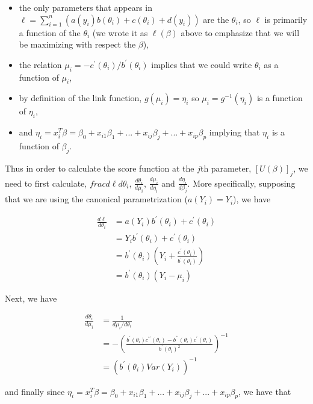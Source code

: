 \begin{itemize}
\item the only parameters that appears in $\ell = \sum_{i=1}^n \left( a(y_i) b(\theta_i) + c(\theta_i) + d(y_i) \right)$ are the $\theta_i$, so $\ell$ is primarily a function of the $\theta_i$ (we wrote it as $\ell(\beta)$ above to emphasize that we will be maximizing with respect the $\beta$),
\item the relation $\mu_i = -c^\prime(\theta_i)/b^\prime(\theta_i)$ implies that we could write $\theta_i$ as a function of $\mu_i$,
\item by definition of the link function, $g(\mu_i) = \eta_i$ so $\mu_i = g^{-1}(\eta_i)$ is a function of $\eta_i$,
\item and $\eta_i = x_i^T \beta = \beta_0 + x_{i1} \beta_1 + ... + x_{ij} \beta_j + ... + x_{ip} \beta_p$ implying that $\eta_i$ is a function of $\beta_j$.
\end{itemize}




Thus in order to calculate the score function at the $j$th parameter, $[U(\beta)]_j$, we need to first calculate, $frac{d \ell}{d \theta_i}$, $\frac{d\theta_i}{d\mu_i}$, $\frac{d\mu_i}{d\eta_i}$ and $\frac{d\eta_i}{d\beta_j}$. More specifically, supposing that we are using the canonical parametrization ($a(Y_i) = Y_i$), we have

\begin{align*}
\frac{d\ell}{d\theta_i} &= a(Y_i) b^\prime(\theta_i) + c^\prime(\theta_i)\\
& = Y_i b^\prime(\theta_i) + c^\prime(\theta_i)\\
& = b^\prime(\theta_i) \left( Y_i + \frac{c^\prime(\theta_i)}{b^\prime(\theta_i)} \right)\\
& = b^\prime(\theta_i)(Y_i - \mu_i)
\end{align*}

Next, we have

\begin{align*}
\frac{d\theta_i}{d\mu_i} &= \frac{1}{d\mu_i/d\theta_i} \\
& = - \left( \frac{b^\prime(\theta_i) c^{\prime \prime}(\theta_i) - b^{\prime \prime}(\theta_i) c^\prime(\theta_i)}{b^\prime(\theta_i)^2} \right)^{-1}\\
& = (b^\prime(\theta_i)Var(Y_i))^{-1}
\end{align*}

and finally since $\eta_i = x_i^T \beta = \beta_0 + x_{i1} \beta_1 + ... + x_{ij} \beta_j + ... + x_{ip} \beta_p$, we have that

